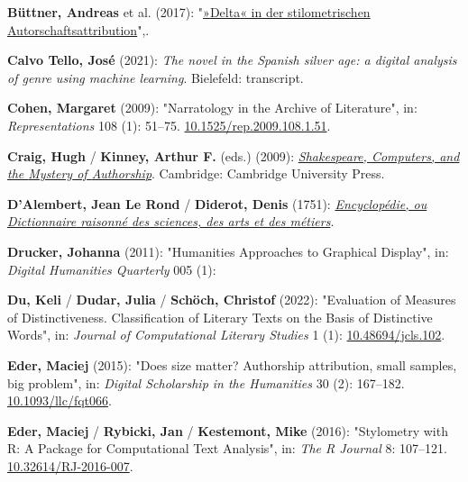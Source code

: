 \documentclass[
  12pt,
  letterpaper,
  DIV=11,
  numbers=noendperiod]{scrreprt}
\newlength{\cslhangindent}
\newenvironment{CSLReferences}[2] %
 {\begin{list}{}{%
  \setlength{\itemindent}{0pt}
  \setlength{\leftmargin}{0pt}
  \setlength{\parsep}{0pt}
  \ifodd #1
   \setlength{\leftmargin}{\cslhangindent}
   \setlength{\itemindent}{-1\cslhangindent}
  \fi
  \setlength{\itemsep}{#2\baselineskip}}}
 {\end{list}}
\begin{document}
\begin{CSLReferences}{1}{0}
\textbf{Büttner, Andreas} et al. (2017):
"\href{http://dx.doi.org/10.17175/2017_006}{»{Delta}« in der
stilometrischen {Autorschaftsattribution}}",.

\textbf{Calvo Tello, José} (2021): \emph{The novel in the {Spanish}
silver age: a digital analysis of genre using machine learning}.
Bielefeld: transcript.

\textbf{Cohen, Margaret} (2009): "Narratology in the {Archive} of
{Literature}", in: \emph{Representations} 108 (1): 51--75.
\href{https://doi.org/10.1525/rep.2009.108.1.51}{10.1525/rep.2009.108.1.51}.

\textbf{Craig, Hugh} / \textbf{Kinney, Arthur F.} (eds.) (2009):
\emph{\href{https://doi.org/10.1017/CBO9780511605437}{Shakespeare,
{Computers}, and the {Mystery} of {Authorship}}}. Cambridge: Cambridge
University Press.

\textbf{D'Alembert, Jean Le Rond} / \textbf{Diderot, Denis} (1751):
\emph{\href{https://fr.wikisource.org/wiki/Encyclop\%C3\%A9die,_ou_Dictionnaire_raisonn\%C3\%A9_des_sciences,_des_arts_et_des_m\%C3\%A9tiers}{Encyclopédie,
ou {Dictionnaire} raisonné des sciences, des arts et des métiers}}.

\textbf{Drucker, Johanna} (2011): "Humanities {Approaches} to
{Graphical} {Display}", in: \emph{Digital Humanities Quarterly} 005 (1):

\textbf{Du, Keli} / \textbf{Dudar, Julia} / \textbf{Schöch, Christof}
(2022): "Evaluation of {Measures} of {Distinctiveness}. {Classification}
of {Literary} {Texts} on the {Basis} of {Distinctive} {Words}", in:
\emph{Journal of Computational Literary Studies} 1 (1):
\href{https://doi.org/10.48694/jcls.102}{10.48694/jcls.102}.

\textbf{Eder, Maciej} (2015): "Does size matter? {Authorship}
attribution, small samples, big problem", in: \emph{Digital Scholarship
in the Humanities} 30 (2): 167--182.
\href{https://doi.org/10.1093/llc/fqt066}{10.1093/llc/fqt066}.

\textbf{Eder, Maciej} / \textbf{Rybicki, Jan} / \textbf{Kestemont, Mike}
(2016): "Stylometry with {R}: {A} {Package} for {Computational} {Text}
{Analysis}", in: \emph{The R Journal} 8: 107--121.
\href{https://doi.org/10.32614/RJ-2016-007}{10.32614/RJ-2016-007}.


\end{CSLReferences}
\end{document}
